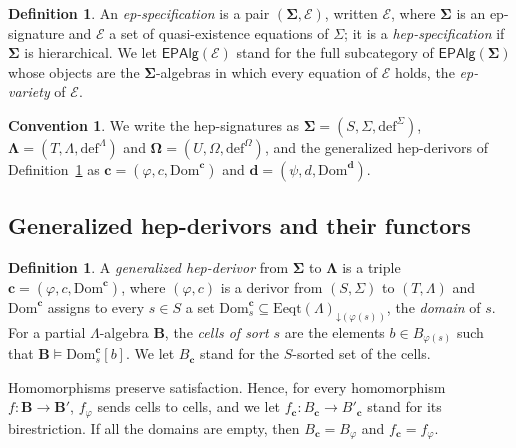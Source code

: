 \documentclass[a4paper,reqno]{amsart}
\newcommand{\vs}[1]{\mathbin{\downarrow}#1}      %
\newcommand{\sig}[1]{\mathbf{#1}}                %
\newcommand{\spec}[1]{\boldsymbol{\mathcal{#1}}} %
\newcommand{\Dom}{\mathrm{Dom}}
\newcommand{\Eeqt}{\mathrm{Eeqt}}
\newcommand{\EPAlg}{\mathsf{EPAlg}}
\newcommand{\mor}{\to}
\newcommand{\defi}{\mathrm{def}}
\theoremstyle{plain}
\theoremstyle{definition}
\newtheorem{definition}[theorem]{Definition}
\newtheorem*{convention}{Convention}
\begin{document}
\begin{definition}\label{DEpSpec}
An \emph{ep-specification} is a pair $(\sig{\Sigma},\mathcal{E})$, written $\spec{E}$, where $\sig{\Sigma}$ is an ep-signature and $\mathcal{E}$ a set of quasi-existence equations of $\Sigma$; it is a \emph{hep-specification} if $\sig{\Sigma}$ is hierarchical.
We let $\EPAlg(\spec{E})$ stand for the full subcategory of $\EPAlg(\sig{\Sigma})$ whose objects are the $\sig{\Sigma}$-algebras in which every equation of $\mathcal{E}$ holds, the \emph{ep-variety} of $\spec{E}$.
\end{definition}

\begin{convention}
We write the hep-signatures as $\sig{\Sigma}=(S,\Sigma,\defi^{\Sigma})$, $\sig{\Lambda}=(T,\Lambda,\defi^{\Lambda})$ and $\sig{\Omega}=(U,\Omega,\defi^{\Omega})$, and the generalized hep-derivors of Definition~\ref{DGenHepDerivor} as $\mathbf{c}=(\varphi,c,\Dom^{\mathbf{c}})$ and $\mathbf{d}=(\psi,d,\Dom^{\mathbf{d}})$.
\end{convention}

\subsection{Generalized hep-derivors and their functors}

\begin{definition}\label{DGenHepDerivor}
A \emph{generalized hep-derivor} from $\sig{\Sigma}$ to $\sig{\Lambda}$ is a triple $\mathbf{c}=(\varphi,c,\Dom^{\mathbf{c}})$, where $(\varphi,c)$ is a derivor from $(S,\Sigma)$ to $(T,\Lambda)$ and $\Dom^{\mathbf{c}}$ assigns to every $s\in S$ a set $\Dom^{\mathbf{c}}_{s}\subseteq\Eeqt(\Lambda)_{\vs{(\varphi(s))}}$, the \emph{domain} of $s$.
For a partial $\Lambda$-algebra $\mathbf{B}$, the \emph{cells of sort $s$} are the elements $b\in B_{\varphi(s)}$ such that $\mathbf{B}\models\Dom^{\mathbf{c}}_{s}[b]$.
We let $B_{\mathbf{c}}$ stand for the $S$-sorted set of the cells.
\end{definition}

Homomorphisms preserve satisfaction.
Hence, for every homomorphism $f\colon\mathbf{B}\mor\mathbf{B}'$, $f_{\varphi}$ sends cells to cells, and we let $f_{\mathbf{c}}\colon B_{\mathbf{c}}\mor B'_{\mathbf{c}}$ stand for its birestriction.
If all the domains are empty, then $B_{\mathbf{c}}=B_{\varphi}$ and $f_{\mathbf{c}}=f_{\varphi}$.
\end{document}
